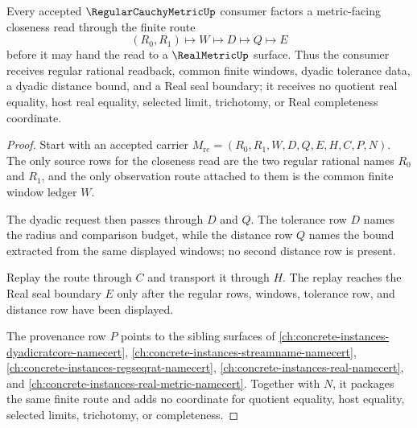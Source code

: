 \begin{theorem}
\label{thm:regular-cauchy-metric-dyadic-closeness-route}
Every accepted $\RegularCauchyMetricUp$ consumer factors a metric-facing closeness read through the finite route
$$
(R_0,R_1)\longmapsto W\longmapsto D\longmapsto Q\longmapsto E
$$
before it may hand the read to a $\RealMetricUp$ surface. Thus the consumer receives regular rational readback, common finite windows, dyadic tolerance data, a dyadic distance bound, and a Real seal boundary; it receives no quotient real equality, host real equality, selected limit, trichotomy, or Real completeness coordinate.
\end{theorem}
\begin{proof}
Start with an accepted carrier $M_{\mathrm{rc}}=(R_0,R_1,W,D,Q,E,H,C,P,N)$. The only source rows for the closeness read are the two regular rational names $R_0$ and $R_1$, and the only observation route attached to them is the common finite window ledger $W$.

The dyadic request then passes through $D$ and $Q$. The tolerance row $D$ names the radius and comparison budget, while the distance row $Q$ names the bound extracted from the same displayed windows; no second distance row is present.

Replay the route through $C$ and transport it through $H$. The replay reaches the Real seal boundary $E$ only after the regular rows, windows, tolerance row, and distance row have been displayed.

The provenance row $P$ points to the sibling surfaces of \autoref{ch:concrete-instances-dyadicratcore-namecert}, \autoref{ch:concrete-instances-streamname-namecert}, \autoref{ch:concrete-instances-regseqrat-namecert}, \autoref{ch:concrete-instances-real-namecert}, and \autoref{ch:concrete-instances-real-metric-namecert}. Together with $N$, it packages the same finite route and adds no coordinate for quotient equality, host equality, selected limits, trichotomy, or completeness.
\end{proof}


